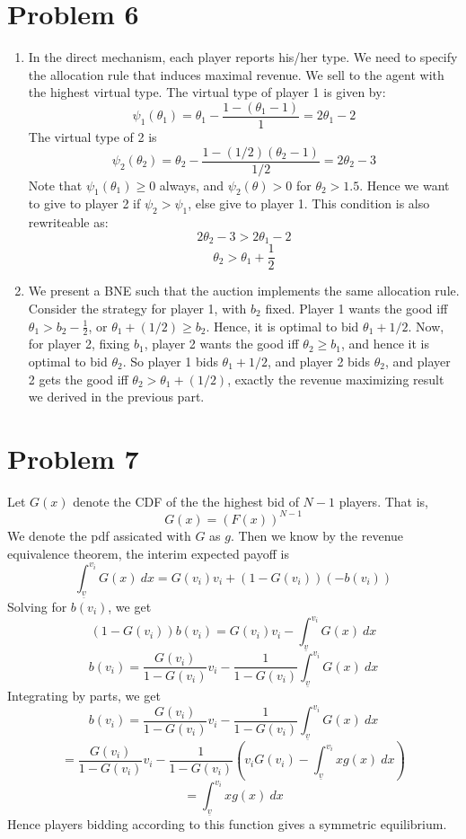 \documentclass[10pt,letter]{article}
\begin{document}
\section*{Problem 6}
\begin{enumerate}[label=(\alph*)]
\item In the direct mechanism, each player reports his/her type. We need to specify the allocation rule that induces maximal revenue. We sell to the agent with the highest virtual type. The virtual type of player 1 is given by:
\[ \psi_1(\theta_1) = \theta_1 - \frac{1 - (\theta_1 - 1)}{1} = 2\theta_1 - 2 \]
The virtual type of 2 is
\[ \psi_2(\theta_2) = \theta_2 - \frac{1 - (1/2)(\theta_2 - 1)}{1/2} = 2\theta_2 - 3 \]
Note that $\psi_1(\theta_1) \ge 0$ always, and $\psi_2(\theta) > 0$ for $\theta_2 > 1.5$. Hence we want to give to player 2 if $\psi_2 > \psi_1$, else give to player 1. This condition is also rewriteable as:
\[ 2\theta_2 - 3 > 2\theta_1 - 2 \]
\[ \theta_2 > \theta_1 + \frac{1}{2}\]
\item We present a BNE such that the auction implements the same allocation rule. Consider the strategy for player 1, with $b_2$ fixed. Player 1 wants the good iff $\theta_1 > b_2 - \frac{1}{2}$, or $\theta_1+ (1/2) \ge b_2$. Hence, it is optimal to bid $\theta_1 + 1/2$. Now, for player 2, fixing $b_1$, player 2 wants the good iff $\theta_2 \ge b_1$, and hence it is optimal to bid $\theta_2$. So player 1 bids $\theta_1 + 1/2$, and player 2 bids $\theta_2$, and player 2 gets the good iff $\theta_2 > \theta_1 + (1/2)$, exactly the revenue maximizing result we derived in the previous part.
\end{enumerate}
\section*{Problem 7}
Let $G(x)$ denote the CDF of the the highest bid of $N-1$ players. That is,
\[ G(x) = (F(x))^{N-1} \]
We denote the pdf assicated with $G$ as $g$. Then we know by the revenue equivalence theorem, the interim expected payoff is
\[ \int_{\underline{v}}^{v_i} G(x) \ dx = G(v_i) v_i + (1-G(v_i))(- b(v_i))  \]
Solving for $b(v_i)$, we get
\[ (1-G(v_i)) b(v_i) = G(v_i) v_i - \int_{\underline{v}}^{v_i} G(x) \ dx    \]
\[  b(v_i) = \frac{G(v_i)}{1-G(v_i)} v_i -\frac{1}{1-G(v_i)} \int_{\underline{v}}^{v_i} G(x) \ dx    \]
Integrating by parts, we get
\[  b(v_i) = \frac{G(v_i)}{1-G(v_i)} v_i -\frac{1}{1-G(v_i)} \int_{\underline{v}}^{v_i} G(x) \ dx    \]
\[ = \frac{G(v_i)}{1-G(v_i)} v_i - \frac{1}{1-G(v_i)}  \left( v_i G(v_i) - \int_{\underline{v}}^{v_i} x g(x) \ dx  \right)  \]
\[ =  \int_{\underline{v}}^{v_i} x g(x) \ dx   \]
Hence players bidding according to this function gives a symmetric equilibrium.
\end{document}
